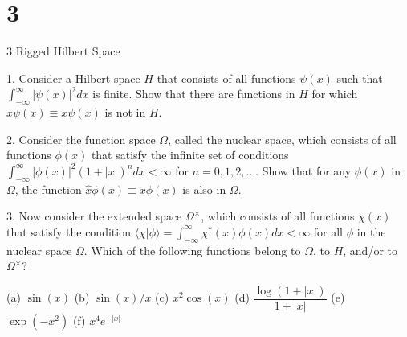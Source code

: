 \documentclass{article}
\begin{document}
\newpage

\section*{3}
\begin{ques}\label{q3}
3 Rigged Hilbert Space

1. Consider a Hilbert space $H$ that consists of all functions $\psi(x)$ such that $\int_{-\infty}^{\infty} |\psi(x)|^2 dx$ is finite. Show that there are functions in $H$ for which $\hat{x}\psi(x) \equiv x\psi(x)$ is not in $H$.

2. Consider the function space $\Omega$, called the nuclear space, which consists of all functions $\phi(x)$ that satisfy the infinite set of conditions $\int_{-\infty}^{\infty} |\phi(x)|^2 (1+|x|)^n dx < \infty$ for $n=0,1,2,\dots$. Show that for any $\phi(x)$ in $\Omega$, the function $\hat{x}\phi(x)\equiv x\phi(x)$ is also in $\Omega$.

3. Now consider the extended space $\Omega^\times$, which consists of all functions $\chi(x)$ that satisfy the condition $\langle \chi|\phi\rangle = \int_{-\infty}^{\infty} \chi^\ast(x)\phi(x)dx <\infty$ for all $\phi$ in the nuclear space $\Omega$. Which of the following functions belong to $\Omega$, to $H$, and/or to $\Omega^\times$?

(a) $\sin(x)$  
(b) $\sin(x)/x$  
(c) $x^2 \cos(x)$  
(d) $\dfrac{\log(1+|x|)}{1+|x|}$  
(e) $\exp(-x^2)$  
(f) $x^4 e^{-|x|}$
\end{ques}
\end{document}
